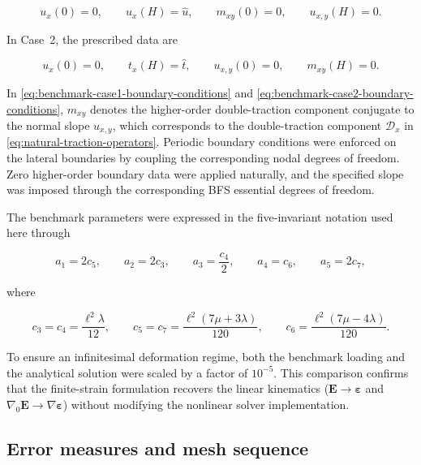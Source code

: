 \documentclass[preprint,12pt]{elsarticle}
\begin{document}
\begin{equation}
 u_x(0)=0,
 \qquad
 u_x(H)=\widehat{u},
 \qquad
 m_{xy}(0)=0,
 \qquad
 u_{x,y}(H)=0.
 \label{eq:benchmark-case1-boundary-conditions}
\end{equation}

In Case~2, the prescribed data are

\begin{equation}
 u_x(0)=0,
 \qquad
 t_x(H)=\widehat{t},
 \qquad
 u_{x,y}(0)=0,
 \qquad
 m_{xy}(H)=0.
 \label{eq:benchmark-case2-boundary-conditions}
\end{equation}

In \eqref{eq:benchmark-case1-boundary-conditions} and \eqref{eq:benchmark-case2-boundary-conditions}, $m_{xy}$ denotes the higher-order double-traction component conjugate to the normal slope $u_{x,y}$, which corresponds to the double-traction component $\mathcal{D}_x$ in \eqref{eq:natural-traction-operators}. Periodic boundary conditions were enforced on the lateral boundaries by coupling the corresponding nodal degrees of freedom. Zero
higher-order boundary data were applied naturally, and the specified slope
was imposed through the corresponding BFS essential degrees of freedom.

The benchmark parameters were expressed in the five-invariant notation
used here through

\begin{equation}
 a_1=2c_5,
 \qquad
 a_2=2c_3,
 \qquad
 a_3=\frac{c_4}{2},
 \qquad
 a_4=c_6,
 \qquad
 a_5=2c_7,
 \label{eq:benchmark-gradient-parameter-map}
\end{equation}

where

\begin{equation}
 c_3=c_4=\frac{\ell^2\lambda}{12},
 \qquad
 c_5=c_7=\frac{\ell^2(7\mu+3\lambda)}{120},
 \qquad
 c_6=\frac{\ell^2(7\mu-4\lambda)}{120}.
 \label{eq:benchmark-gradient-coefficients}
\end{equation}

To ensure an infinitesimal deformation regime, both the benchmark loading and the
analytical solution were scaled by a factor of $10^{-5}$. This comparison confirms
that the finite-strain formulation recovers the linear kinematics
($\mathbf{E}\to\boldsymbol{\varepsilon}$ and $\nabla_0\mathbf{E}\to\nabla\boldsymbol{\varepsilon}$)
without modifying the nonlinear solver implementation.

\subsection{Error measures and mesh sequence}
\end{document}
